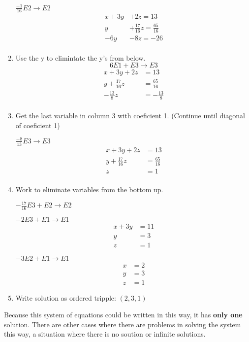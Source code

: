 \begin{example}[1]
\begin{enumerate}
		$\frac{-1}{16}E 2 \to E 2$
		\begin{align*}
			x + 3y& + 2z = 13 \\
			y& + \frac{17}{16}z =  \frac{65}{16} \\
			-6y& - 8z =  -26 \\
		\end{align*}
	\item Use the y to elimintate the y's from below.
		\[
			6 E 1 + E 3 \to E 3
		\]
		\begin{align*}
			x + 3y + 2z& = 13 \\
			y + \frac{17}{16}z& = \frac{65}{16} \\
			-\frac{13}{8}z& =  -\frac{13}{8}\\
		\end{align*}

	\item Get the last variable in column 3 with coeficient 1. (Continue until diagonal of coeficient 1)

		$\frac{-8}{13}E 3 \to E 3$
		\begin{align*}
			x + 3y + 2z& = 13 \\
			y + \frac{17}{16}z& = \frac{65}{16} \\
			z& =  1\\
		\end{align*}
	\item Work to eliminate variables from the bottom up.

			$-\frac{17}{16}E 3 + E 2 \to E 2$

		$-2 E 3 + E 1 \to E 1$
		\begin{align*}
			x + 3y &= 11 \\
			y &= 3 \\
			z &= 1
		\end{align*}

			$-3 E 2 + E 1 \to E 1$
		\begin{align*}
			x &= 2 \\
			y &= 3 \\
			z &= 1
		\end{align*}

	\item Write solution as ordered tripple: $(2,3,1)$

\end{enumerate}

\end{example}
Because this system of equations could be written in this way, it has \textbf{only one} solution. There are
other cases where there are problems in solving the system this way, a situation where there is no soution
or infinite solutions.

